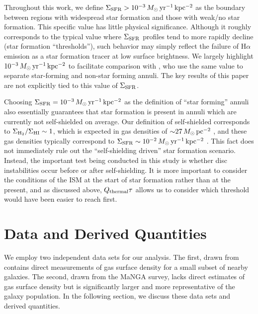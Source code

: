 \documentclass[fleqn,usenatbib]{mnras}
\newcommand{\qh}{Q_{\rm thermal}}
\begin{document}
Throughout this work, we define \mbox{$\Sigma_{\rm SFR}>10^{-3}\,M_{\odot}\,{\rm yr^{-1}\,kpc^{-2}}$} as the boundary between regions with widespread star formation and those with weak/no star formation. This specific value has little physical significance. Although it roughly corresponds to the typical value where $\Sigma_{\rm SFR}$ profiles tend to more rapidly decline (star formation ``thresholds''), such behavior may simply reflect the failure of H$\alpha$ emission as a star formation tracer at low surface brightness. We largely highlight $10^{-3}\,M_{\odot}\,{\rm yr^{-1}\,kpc^{-2}}$ to facilitate comparison with \cite{Orr17}, who use the same value to separate star-forming and non-star forming annuli. The key results of this paper are not explicitly tied to this value of $\Sigma_{\rm SFR}$.

Choosing $\Sigma_{\rm SFR}=10^{-3}\,M_{\odot}\,{\rm yr^{-1}\,kpc^{-2}}$ as the definition of ``star forming'' annuli also essentially guarantees that star formation is present in annuli which are currently not self-shielded on average.  Our definition of self-shielded corresponds to $\Sigma_{\rm H_2}/\Sigma_{\rm HI} \sim 1$, which is expected in gas densities of ${\sim}27\,M_{\odot}\,{\rm pc^{-2}}$ \citep{Krumholz09}, and these gas densities typically correspond to $\Sigma_{\rm SFR}\sim10^{-2}\,M_{\odot}\,{\rm yr^{-1}\,kpc^{-2}}$ \citep{Bigiel08}. This fact does not immediately rule out the ``self-shielding driven'' star formation scenario. Instead, the important test being conducted in this study is whether disc instabilities occur before or after self-shielding. It is more important to consider the conditions of the ISM at the start of star formation rather than at the present, and as discussed above, $\qh\tau$ allows us to consider which threshold would have been easier to reach first.

\section{Data and Derived Quantities}
\label{sec:data}

We employ two independent data sets for our analysis. The first, drawn from \citet[hereafter L08]{Leroy08} contains direct measurements of gas surface density for a small subset of nearby galaxies.  The second, drawn from the MaNGA survey, lacks direct estimates of gas surface density but is significantly larger and more representative of the galaxy population. In the following section, we discuss these data sets and derived quantities.
\end{document}
